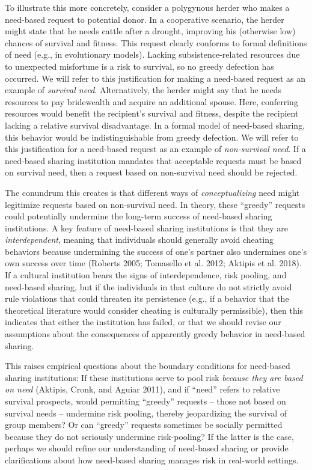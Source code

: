 \documentclass[
]{article}
\begin{document}
To illustrate this more concretely, consider a polygynous herder who makes a need-based request to potential donor. In a cooperative scenario, the herder might state that he needs cattle after a drought, improving his (otherwise low) chances of survival and fitness. This request clearly conforms to formal definitions of need (e.g., in evolutionary models). Lacking subsistence-related resources due to unexpected misfortune is a risk to survival, so no greedy defection has occurred. We will refer to this justification for making a need-based request as an example of \emph{survival need}. Alternatively, the herder might say that he needs resources to pay bridewealth and acquire an additional spouse. Here, conferring resources would benefit the recipient's survival and fitness, despite the recipient lacking a relative survival disadvantage. In a formal model of need-based sharing, this behavior would be indistinguishable from greedy defection. We will refer to this justification for a need-based request as an example of \emph{non-survival need}. If a need-based sharing institution mandates that acceptable requests must be based on survival need, then a request based on non-survival need should be rejected.

The conundrum this creates is that different ways of \emph{conceptualizing} need might legitimize requests based on non-survival need. In theory, these ``greedy'' requests could potentially undermine the long-term success of need-based sharing institutions. A key feature of need-based sharing institutions is that they are \emph{interdependent}, meaning that individuals should generally avoid cheating behaviors because undermining the success of one's partner also undermines one's own success over time (Roberts 2005; Tomasello et al. 2012; Aktipis et al. 2018). If a cultural institution bears the signs of interdependence, risk pooling, and need-based sharing, but if the individuals in that culture do not strictly avoid rule violations that could threaten its persistence (e.g., if a behavior that the theoretical literature would consider cheating is culturally permissible), then this indicates that either the institution has failed, or that we should revise our assumptions about the consequences of apparently greedy behavior in need-based sharing.

This raises empirical questions about the boundary conditions for need-based sharing institutions: If these institutions serve to pool risk \emph{because they are based on need} (Aktipis, Cronk, and Aguiar 2011), and if ``need'' refers to relative survival prospects, would permitting ``greedy'' requests -- those not based on survival needs -- undermine risk pooling, thereby jeopardizing the survival of group members? Or can ``greedy'' requests sometimes be socially permitted because they do not seriously undermine risk-pooling? If the latter is the case, perhaps we should refine our understanding of need-based sharing or provide clarifications about how need-based sharing manages risk in real-world settings.
\end{document}
